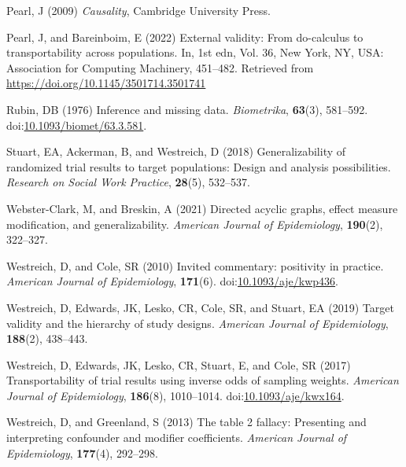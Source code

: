 \documentclass[
  single column]{article}
\newlength{\cslhangindent}
\newenvironment{CSLReferences}[2] %
 {\begin{list}{}{%
  \setlength{\itemindent}{0pt}
  \setlength{\leftmargin}{0pt}
  \setlength{\parsep}{0pt}
  \ifodd #1
   \setlength{\leftmargin}{\cslhangindent}
   \setlength{\itemindent}{-1\cslhangindent}
  \fi
  \setlength{\itemsep}{#2\baselineskip}}}
 {\end{list}}
\begin{document}
\begin{CSLReferences}{1}{0}
Pearl, J (2009) \emph{Causality}, Cambridge University Press.

Pearl, J, and Bareinboim, E (2022) External validity: From do-calculus
to transportability across populations. In, 1st edn, Vol. 36, New York,
NY, USA: Association for Computing Machinery, 451--482. Retrieved from
\url{https://doi.org/10.1145/3501714.3501741}

Rubin, DB (1976) Inference and missing data. \emph{Biometrika},
\textbf{63}(3), 581--592.
doi:\href{https://doi.org/10.1093/biomet/63.3.581}{10.1093/biomet/63.3.581}.

Stuart, EA, Ackerman, B, and Westreich, D (2018) Generalizability of
randomized trial results to target populations: Design and analysis
possibilities. \emph{Research on Social Work Practice}, \textbf{28}(5),
532--537.

Webster-Clark, M, and Breskin, A (2021) Directed acyclic graphs, effect
measure modification, and generalizability. \emph{American Journal of
Epidemiology}, \textbf{190}(2), 322--327.

Westreich, D, and Cole, SR (2010) Invited commentary: positivity in
practice. \emph{American Journal of Epidemiology}, \textbf{171}(6).
doi:\href{https://doi.org/10.1093/aje/kwp436}{10.1093/aje/kwp436}.

Westreich, D, Edwards, JK, Lesko, CR, Cole, SR, and Stuart, EA (2019)
Target validity and the hierarchy of study designs. \emph{American
Journal of Epidemiology}, \textbf{188}(2), 438--443.

Westreich, D, Edwards, JK, Lesko, CR, Stuart, E, and Cole, SR (2017)
Transportability of trial results using inverse odds of sampling
weights. \emph{American Journal of Epidemiology}, \textbf{186}(8),
1010--1014.
doi:\href{https://doi.org/10.1093/aje/kwx164}{10.1093/aje/kwx164}.

Westreich, D, and Greenland, S (2013) The table 2 fallacy: Presenting
and interpreting confounder and modifier coefficients. \emph{American
Journal of Epidemiology}, \textbf{177}(4), 292--298.

\end{CSLReferences}
\end{document}

